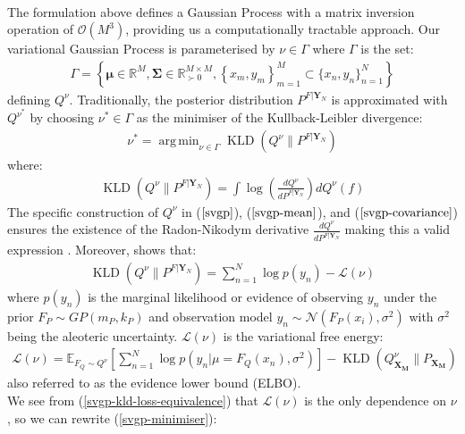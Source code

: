 \documentclass[twoside,11pt]{article}
\newcommand{\KLD}{\operatorname{KLD}}
\DeclareMathOperator*{\argmin}{arg\,min}
\begin{document}
\\The formulation above defines a Gaussian Process with a matrix inversion operation of $\mathcal{O}(M^3)$, providing us a computationally tractable approach. Our variational Gaussian Process is parameterised by $\nu \in \Gamma$ where $\Gamma$ is the set:
\begin{align}
    \Gamma = \left\{\mathbf{\mu} \in \mathbb{R}^{M}, \mathbf{\Sigma} \in \mathbb{R}^{M\times M}_{\succ 0}, \left\{x_m, y_m\right\}_{m=1}^{M} \subset \{x_n, y_n\}_{n=1}^{N}\right\}
    \label{svgp-parameter-set}
\end{align} 
defining $Q^{\nu}$. Traditionally, the posterior distribution $P^{F \vert \mathbf{Y}_N}$ is approximated with $Q^{\nu^*}$ by choosing $\nu^* \in \Gamma$ as the minimiser of the Kullback-Leibler divergence:
\begin{align}
    \nu^* = \argmin_{\nu \in \Gamma} \KLD\left(Q^{\nu} \Big\| P^{F \vert \mathbf{Y}_N} \right)
    \label{svgp-minimiser}
\end{align}
where:
\begin{align}
    \KLD\left(Q^{\nu} \Big\| P^{F \vert \mathbf{Y}_N} \right) = \int \log \left( \frac{dQ^{\nu}}{d P^{F \vert \mathbf{Y}_N}} \right) d Q^{\nu}(f)
    \label{svgp-kld-loss}
\end{align}
The specific construction of $Q^{\nu}$ in ($\ref{svgp}$),  ($\ref{svgp-mean}$), and ($\ref{svgp-covariance}$) ensures the existence of the Radon-Nikodym derivative $\frac{dQ^{\nu}}{d P^{F \vert \mathbf{Y}_N}}$ making this a valid expression \cite{matthews2016sparse}. Moreover, \cite{matthews2016sparse} shows that:
\begin{align}
    \KLD\left(Q^{\nu} \Big\| P^{F \vert \mathbf{Y}_N} \right) = \sum_{n=1}^N\log p(y_n) - \mathcal{L}(\nu)
    \label{svgp-kld-loss-equivalence}
\end{align}
where $p(y_n)$ is the marginal likelihood or evidence of observing $y_n$ under the prior $F_P \sim GP(m_P, k_P)$ and observation model $y_n \sim \mathcal{N}(F_P(x_i), \sigma^2)$ with $\sigma^2$ being the aleoteric uncertainty. $\mathcal{L}(\nu)$ is the variational free energy:
\begin{align}
    \mathcal{L}(\nu) = \mathbb{E}_{F_Q \sim Q^{\nu}}\left[\sum_{n=1}^{N}\log p\left(y_n \vert \mu=F_Q(x_n), \sigma^2\right)\right] -\KLD\left(Q^{\nu}_{\mathbf{X_M}}\Big\| P_{\mathbf{X_M}}\right) 
    \label{elbo}
\end{align}
also referred to as the evidence lower bound (ELBO). 
\\We see from (\ref{svgp-kld-loss-equivalence}) that $\mathcal{L}(\nu)$ is the only dependence on $\nu$, so we can rewrite (\ref{svgp-minimiser}):
\end{document}
